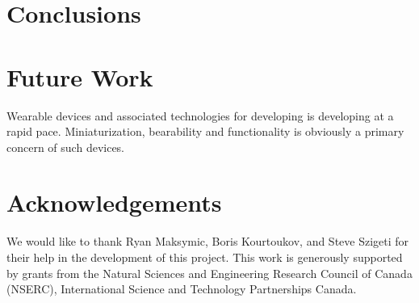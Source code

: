 \documentclass{chi-ext}
\begin{document}
\section{Conclusions}

\section{Future Work}
Wearable devices and associated technologies for developing is developing at a rapid pace.
Miniaturization, bearability and functionality is obviously a primary concern of such devices. 

\section{Acknowledgements}

We would like to thank Ryan Maksymic, Boris Kourtoukov, and Steve Szigeti for their help in the development of this project. This work is generously supported by grants from the Natural Sciences and Engineering Research Council of Canada (NSERC), International Science and Technology Partnerships Canada.

\balance


\end{document}
